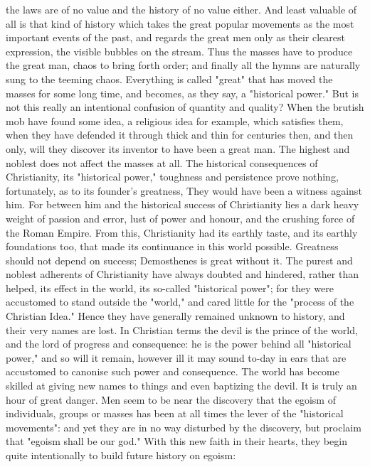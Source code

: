 the laws are of no value and the history of no value either. And
least valuable of all is that kind of history which takes the great
popular movements as the most important events of the past, and
regards the great men only as their clearest expression, the visible
bubbles on the stream. Thus the masses have to produce the great man,
chaos to bring forth order; and finally all the hymns are naturally
sung to the teeming chaos. Everything is called "great" that has
moved the masses for some long time, and becomes, as they say, a
"historical power." But is not this really an intentional confusion
of quantity and quality? When the brutish mob have found some idea, a
religious idea for example, which satisfies them, when they have
defended it through thick and thin for centuries then, and then only,
will they discover its inventor to have been a great man. The highest
and noblest does not affect the masses at all. The historical
consequences of Christianity, its "historical power," toughness and
persistence prove nothing, fortunately, as to its founder's
greatness, They would have been a witness against him. For between
him and the historical success of Christianity lies a dark heavy
weight of passion and error, lust of power and honour, and the
crushing force of the Roman Empire. From this, Christianity had its
earthly taste, and its earthly foundations too, that made its
continuance in this world possible. Greatness should not depend on
success; Demosthenes is great without it. The purest and noblest
adherents of Christianity have always doubted and hindered, rather
than helped, its effect in the world, its so-called "historical
power"; for they were accustomed to stand outside the "world," and
cared little for the "process of the Christian Idea." Hence they have
generally remained unknown to history, and their very names are lost.
In Christian terms the devil is the prince of the world, and the lord
of progress and consequence: he is the power behind all "historical
power," and so will it remain, however ill it may sound to-day in
ears that are accustomed to canonise such power and consequence. The
world has become skilled at giving new names to things and even
baptizing the devil. It is truly an hour of great danger. Men seem to
be near the discovery that the egoism of individuals, groups or
masses has been at all times the lever of the "historical movements":
and yet they are in no way disturbed by the discovery, but proclaim
that "egoism shall be our god." With this new faith in their hearts,
they begin quite intentionally to build future history on egoism:
